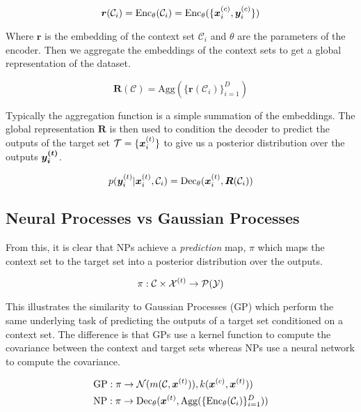 \documentclass[main.tex]{subfiles}
\begin{document}
\begin{equation}
    \bm{r}(\mathcal{C}_i) = \text{Enc}_\theta(\mathcal{C}_i) = \text{Enc}_\theta(\{ \bm{x}_{i}^{(c)}, \bm{y}_i^{(c)} \})
\end{equation}

Where $\bm{r}$ is the embedding of the context set $\mathcal{C}_i$ and $\theta$ are the parameters of the encoder. Then we aggregate the embeddings of the context sets to get a global representation of the dataset. 

\begin{equation}
    \bm{R}(\mathcal{C}) = \text{Agg}(\{ \bm{r}(\mathcal{C}_i) \}_{i=1}^D)
\end{equation}

Typically the aggregation function is a simple summation of the embeddings. The global representation $\bm{R}$ is then used to condition the decoder to predict the outputs of the target set $\mathcal{T} = \{ \bm{x}_{i}^{(t)} \}$ to give us a posterior distribution over the outputs $\bm{y_i^{(t)}}$.

\begin{equation}
    p(\bm{y}_i^{(t)} | \bm{x}_i^{(t)}, \mathcal{C}_i) = \text{Dec}_\theta(\bm{x}_i^{(t)}, \bm{R}(\mathcal{C}_i))
\end{equation}

\subsection{Neural Processes vs Gaussian Processes}

From this, it is clear that NPs achieve a \emph{prediction} map, $\pi$ which maps the context set to the target set into a posterior distribution over the outputs. 

\begin{equation}
    \pi: \mathcal{C} \times \mathcal{X}^{(t)} \rightarrow \mathcal{P}(\mathcal{Y})
\end{equation}


This illustrates the similarity to Gaussian Processes (GP) \cite{books/lib/RasmussenW06} which perform the same underlying task of predicting the outputs of a target set conditioned on a context set. The difference is that GPs use a kernel function to compute the covariance between the context and target sets whereas NPs use a neural network to compute the covariance.

\begin{align}
    &\text{GP}: \pi \rightarrow \mathcal{N}(m(
    \mathcal{C}, \bm{x}^{(t)})
    ), k(\bm{x}^{(c)}, \bm{x}^{(t)})) \\
    &\text{NP}: \pi \rightarrow \text{Dec}_\theta(\bm{x}^{(t)},  
    \text{Agg}(\{ \text{Enc}_\theta(\mathcal{C}_i) \}_{i=1}^D))
\end{align}
\end{document}
